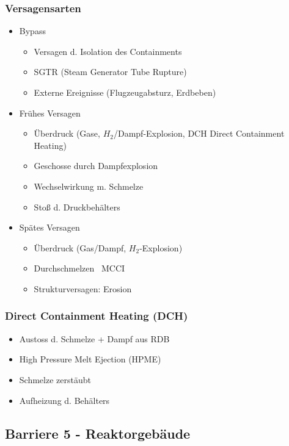 \documentclass[12pt]{article}
\begin{document}
\subsubsection{Versagensarten}
\begin{itemize}
	\item Bypass
		\begin{itemize}
			\item Versagen d. Isolation des Containments
			\item SGTR (Steam Generator Tube Rupture)
			\item Externe Ereignisse (Flugzeugabsturz, Erdbeben)
		\end{itemize}
	\item Frühes Versagen
		\begin{itemize}
			\item Überdruck (Gase, \(H_2\)/Dampf-Explosion, DCH \textrightarrow Direct Containment Heating)
			\item Geschosse durch Dampfexplosion
			\item Wechselwirkung m. Schmelze
			\item Stoß d. Druckbehälters
		\end{itemize}
	\item Spätes Versagen
		\begin{itemize}
			\item Überdruck (Gas/Dampf, \(H_2\)-Explosion)
			\item Durchschmelzen \textrightarrow\ MCCI
			\item Strukturversagen: Erosion
		\end{itemize}
\end{itemize}

\subsubsection{Direct Containment Heating (DCH)}
\begin{itemize}
	\item Austoss d. Schmelze + Dampf aus RDB
	\item High Pressure Melt Ejection (HPME)
	\item Schmelze zerstäubt
	\item Aufheizung d. Behälters
\end{itemize}

\subsection{Barriere 5 - Reaktorgebäude}
\end{document}
